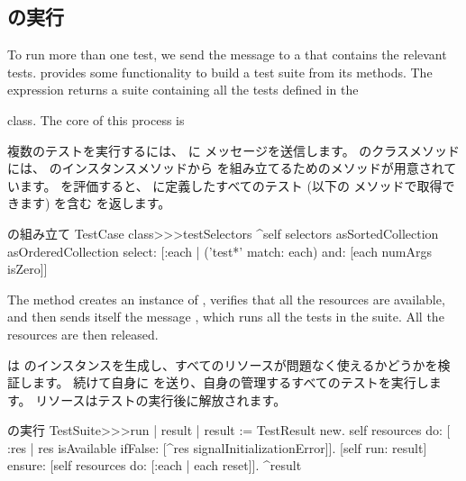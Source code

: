 \documentclass[a4paper,10pt,twoside]{book}
\begin{document}
\subsection{ の実行}

To run more than one test, we send the message
 to a  that contains the relevant tests. 
 provides some functionality to build a test suite from
its methods.  The expression  returns a suite containing all the tests defined in the { class.
The core of this process is
\fi

複数のテストを実行するには、  に  メッセージを送信します。
 のクラスメソッドには、  のインスタンスメソッドから  を組み立てるためのメソッドが用意されています。
 を評価すると、  に定義したすべてのテスト (以下の  メソッドで取得できます) を含む  を返します。

\begin{method}[testcasetestselectors]{ の組み立て}
TestCase class>>>testSelectors 
	^self selectors asSortedCollection asOrderedCollection select: [:each | 
		('test*' match: each) and: [each numArgs isZero]]
\end{method}

The method  creates an instance of
, verifies that all the resources are available, and then sends itself
the message , which runs all
the tests in the suite.  All the resources are then
released.
\fi

 は  のインスタンスを生成し、すべてのリソースが問題なく使えるかどうかを検証します。
続けて自身に  を送り、自身の管理するすべてのテストを実行します。
リソースはテストの実行後に解放されます。

\begin{method}[testsuiterun]{ の実行}
TestSuite>>>run
	| result |
 	result := TestResult new.
	self resources do: [ :res |
		res isAvailable ifFalse: [^res signalInitializationError]].
	[self run: result] ensure: [self resources do: [:each | each reset]].
	^result
\end{method}

}
\end{document}
